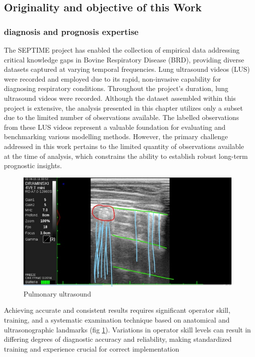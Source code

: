 \subsection{Originality and objective of this Work}

\subsubsection*{diagnosis and prognosis expertise}

The SEPTIME project has enabled the collection of empirical data addressing critical knowledge gaps in Bovine Respiratory Disease (BRD), providing diverse datasets captured at varying temporal frequencies. Lung ultrasound videos (LUS) were recorded and employed due to its rapid, non-invasive capability for diagnosing respiratory conditions. Throughout the project's duration, lung ultrasound videos were recorded. Although the dataset assembled within this project is extensive, the analysis presented in this chapter utilizes only a subset due to the limited number of observations available. The labelled observations from these LUS videos represent a valuable foundation for evaluating and benchmarking various modelling methods. However, the primary challenge addressed in this work pertains to the limited quantity of observations available at the time of analysis, which constrains the ability to establish robust long-term prognostic insights.

\begin{figure}
  \includegraphics[width=\linewidth]{figures/chap2/annotated_ultrasound.jpg}
  \caption{Pulmonary ultrasound}
  \label{fig:ultrasound}
\end{figure}
\newpage

Achieving accurate and consistent results requires significant operator skill, training, and a systematic examination technique based on anatomical and ultrasonographic landmarks (fig \ref{fig:ultrasound}). Variations in operator skill levels can result in differing degrees of diagnostic accuracy and reliability, making standardized training and experience crucial for correct implementation



